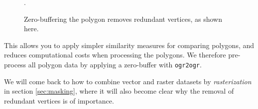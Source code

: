 \begin{figure}[H]
  \centering
  
  \caption{Zero-buffering the polygon removes redundant vertices, as shown here.}
  \label{fig:redundant-zero-buffer}.
\end{figure}

This allows you to apply simpler similarity measures for comparing polygons, and reduces computational costs when processing the polygons.
We therefore pre-process all polygon data by applying a zero-buffer with \texttt{ogr2ogr}.


We will come back to how to combine vector and raster datasets by \textit{rasterization} in section \ref{sec:masking}, where it will also become clear why the removal of redundant vertices is of importance.
